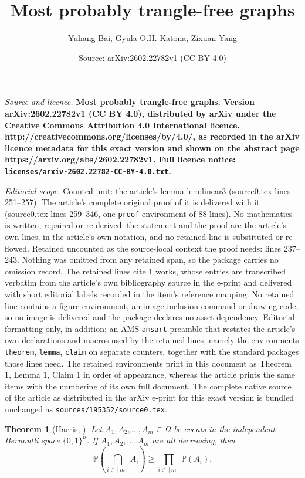 \documentclass[10pt,a4paper]{amsart}
\title{\bf\Large Most probably trangle-free graphs}
\author{Yuhang Bai, Gyula O.H. Katona, Zixuan Yang}
\date{Source: arXiv:2602.22782v1 (CC BY 4.0)}
\newtheorem{theorem}{Theorem}
\begin{document}
\maketitle

\noindent\emph{Source and licence.} \bf\Large Most probably trangle-free graphs. Version arXiv:2602.22782v1 (CC BY 4.0), distributed by arXiv under the Creative Commons Attribution 4.0 International licence, http://creativecommons.org/licenses/by/4.0/, as recorded in the arXiv licence metadata for this exact version and shown on the abstract page https://arxiv.org/abs/2602.22782v1. Full licence notice: \texttt{licenses/arxiv-2602.22782-CC-BY-4.0.txt}.\par\smallskip

\noindent\textit{Editorial scope.} Counted unit: the article's lemma lem:linear3 (source0.tex lines 251--257). The article's complete original proof of it is delivered with it (source0.tex lines 259--346, one \texttt{proof} environment of 88 lines). No mathematics is written, repaired or re-derived: the statement and the proof are the article's own lines, in the article's own notation, and no retained line is substituted or re-flowed.  Retained uncounted as the source-local context the proof needs: lines 237--243.  Nothing was omitted from any retained span, so the package carries no omission record.  The retained lines cite 1 works, whose entries are transcribed verbatim from the article's own bibliography source in the e-print and delivered with short editorial labels recorded in the item's reference mapping.  No retained line contains a figure environment, an image-inclusion command or drawing code, so no image is delivered and the package declares no asset dependency.  Editorial formatting only, in addition: an AMS \texttt{amsart} preamble that restates the article's own declarations and macros used by the retained lines, namely the environments \texttt{theorem}, \texttt{lemma}, \texttt{claim} on separate counters, together with the standard packages those lines need.  The retained environments print in this document as Theorem 1, Lemma 1, Claim 1 in order of appearance, whereas the article prints the same items with the numbering of its own full document.  The complete native source of the article as distributed in the arXiv e-print for this exact version is bundled unchanged as \texttt{sources/195352/source0.tex}.
\begin{theorem}[Harris, \cite{Har}]\label{Har-ineq}
    Let $A_1, A_2,\ldots, A_m \subseteq \Omega$ be events in the independent Bernoulli space $\{0,1\}^n$.
    If $A_1,A_2,\ldots,A_m$  are all decreasing, then
    \[
    \mathbb{P}(\bigcap_{i\in [m]}A_i ) \geq \prod_{i\in [m]}\mathbb{P}(A_i).
    \]
\end{theorem}
\end{document}
